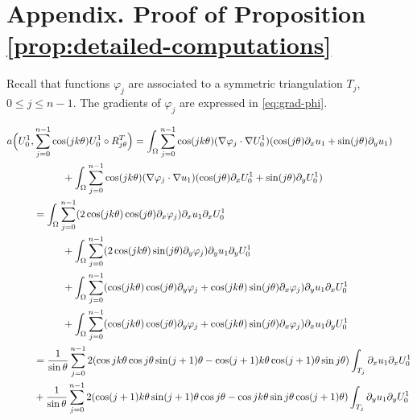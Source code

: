 \documentclass[JEP,XML,SOM,Unicode,ThmDefs,NoFloatCountersInSection,published]{cedram}
\theoremstyle{plain}
\theoremstyle{definition}
\begin{document}
\appendix

\section*{Appendix. Proof of Proposition \ref{prop:detailed-computations}}
\label{appendix:computations}

Recall that functions $\varphi_j$ are associated to a symmetric triangulation $T_j$, $0 \leq j \leq n-1$. The gradients of $\varphi_j$ are expressed in \eqref{eq:grad-phi}.

\vspace*{-1\baselineskip}
\bgroup\smaller
\begin{align*}
a\Bigl(U_0^1,&\sum_{j=0}^{n-1} \cos(jk\theta) U_0^1 \circ R_{j\theta}^T\Bigr) = \int_\Omega \sum_{j=0}^{n-1} \cos(jk\theta)(\nabla \varphi_j\cdot \nabla U_0^1)(\cos(j\theta) \partial_x u_1+\sin (j\theta)\partial_y u_1) \\
&\hspace*{1cm}+ \int_\Omega \sum_{j=0}^{n-1}\cos(jk\theta) (\nabla \varphi_j\cdot \nabla u_1)(\cos(j\theta) \partial_x U_0^1 +\sin(j\theta) \partial_y U_0^1) \\
&= \int_\Omega \sum_{j=0}^{n-1} (2 \cos(jk\theta)\cos(j\theta)\partial_x \varphi_j) \partial_x u_1 \partial_x U_0^1 \\
&\hspace*{1cm}+ \int_\Omega \sum_{j=0}^{n-1}(2\cos(jk\theta)\sin(j\theta)\partial_y \varphi_j) \partial_y u_1 \partial_y U_0^1 \\
&\hspace*{1cm}+ \int_\Omega \sum_{j=0}^{n-1} (\cos(jk\theta)\cos(j\theta)\partial_y \varphi_j+\cos(jk\theta)\sin(j\theta)\partial_x \varphi_j) \partial_y u_1 \partial_x U_0^1 \\
&\hspace*{1cm}+ \int_\Omega \sum_{j=0}^{n-1} (\cos(jk\theta)\cos(j\theta)\partial_y \varphi_j+\cos(jk\theta)\sin(j\theta)\partial_x \varphi_j) \partial_x u_1 \partial_y U_0^1\\
&=\frac{1}{\sin \theta}\sum_{j=0}^{n-1}2 (\cos jk\theta \cos j \theta \sin(j+1)\theta -\cos(j+1)k\theta \cos (j+1)\theta \sin j\theta) \int_{T_j} \partial_x u_1 \partial_x U_0^1
\\
&+\frac{1}{\sin \theta}\sum_{j=0}^{n-1} 2(\cos(j+1)k\theta \sin(j+1)\theta \cos j \theta-\cos jk\theta \sin j \theta \cos(j+1)\theta)\int_{T_j} \partial_y u_1 \partial_y U_0^1
\\

\end{align*}
\end{document}
